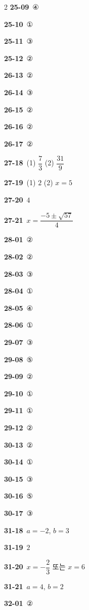 \documentclass[10pt,a4paper]{article}
\begin{document}
\begin{multicols}{2}
\noindent\textbf{25-09}\ ④\par
\noindent\textbf{25-10}\ ①\par
\noindent\textbf{25-11}\ ③\par
\noindent\textbf{25-12}\ ②\par
\noindent\textbf{26-13}\ ②\par
\noindent\textbf{26-14}\ ③\par
\noindent\textbf{26-15}\ ②\par
\noindent\textbf{26-16}\ ②\par
\noindent\textbf{26-17}\ ②\par
\noindent\textbf{27-18}\ (1) $\dfrac{7}{3}$ (2) $\dfrac{31}{9}$\par
\noindent\textbf{27-19}\ (1) $2$ (2) $x=5$\par
\noindent\textbf{27-20}\ $4$\par
\noindent\textbf{27-21}\ $x=\dfrac{-5\pm\sqrt{57}}{4}$\par
\noindent\textbf{28-01}\ ②\par
\noindent\textbf{28-02}\ ②\par
\noindent\textbf{28-03}\ ③\par
\noindent\textbf{28-04}\ ①\par
\noindent\textbf{28-05}\ ④\par
\noindent\textbf{28-06}\ ①\par
\noindent\textbf{29-07}\ ③\par
\noindent\textbf{29-08}\ ⑤\par
\noindent\textbf{29-09}\ ②\par
\noindent\textbf{29-10}\ ①\par
\noindent\textbf{29-11}\ ①\par
\noindent\textbf{29-12}\ ②\par
\noindent\textbf{30-13}\ ②\par
\noindent\textbf{30-14}\ ①\par
\noindent\textbf{30-15}\ ③\par
\noindent\textbf{30-16}\ ⑤\par
\noindent\textbf{30-17}\ ③\par
\noindent\textbf{31-18}\ $a=-2$, $b=3$\par
\noindent\textbf{31-19}\ $2$\par
\noindent\textbf{31-20}\ $x=-\dfrac{2}{3}$ 또는 $x=6$\par
\noindent\textbf{31-21}\ $a=4$, $b=2$\par
\noindent\textbf{32-01}\ ②\par

\end{multicols}
\end{document}
